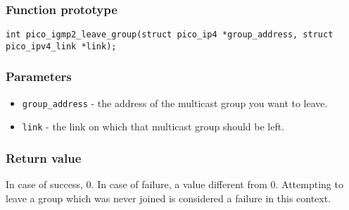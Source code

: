 \subsubsection*{Function prototype}
\texttt{int pico\_igmp2\_leave\_group(struct pico\_ip4 *group\_address, struct pico\_ipv4\_link *link);}

\subsubsection*{Parameters}
\begin{itemize}[noitemsep]
\item \texttt{group\_address} - the address of the multicast group you want to leave.
\item \texttt{link} - the link on which that multicast group should be left.
\end{itemize}

\subsubsection*{Return value}
In case of success, 0. In case of failure, a value different from 0. Attempting to leave a group
which was never joined is considered a failure in this context. 



